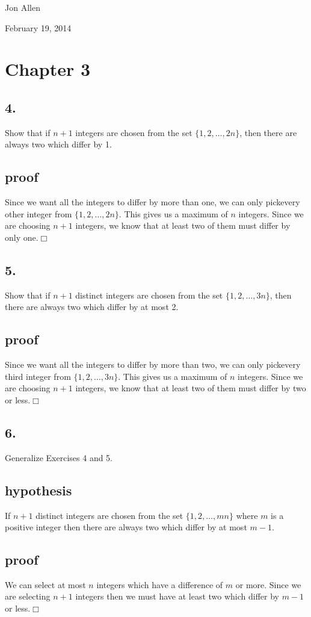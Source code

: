 \documentclass{article}
\begin{document}
Jon Allen

February 19, 2014

\section*{Chapter 3}
\subsection*{4.}
Show that if $n+1$ integers are chosen from the set $\{1,2,\dots,2n\}$, then there are always two which differ by 1.
\subsection*{proof}
Since we want all the integers to differ by more than one, we can only pickevery other integer from $\{1,2,\dots,2n\}$. This gives us a maximum of $n$ integers. Since we are choosing $n+1$ integers, we know that at least two of them must differ by only one.$\Box$
\subsection*{5.}
Show that if $n+1$ distinct integers are chosen from the set $\{1,2,\dots,3n\}$, then there are always two which differ by at most 2.
\subsection*{proof}
Since we want all the integers to differ by more than two, we can only pickevery third integer from $\{1,2,\dots,3n\}$. This gives us a maximum of $n$ integers. Since we are choosing $n+1$ integers, we know that at least two of them must differ by two or less.$\Box$
\subsection*{6.}
Generalize Exercises 4 and 5.
\subsection*{hypothesis}
If $n+1$ distinct integers are chosen from the set $\{1,2,\dots,mn\}$ where $m$ is a positive integer then there are always two which differ by at most $m-1$.
\subsection*{proof}
We can select at most $n$ integers which have a difference of $m$ or more. Since we are selecting $n+1$ integers then we must have at least two which differ by $m-1$ or less.$\Box$
\end{document}
